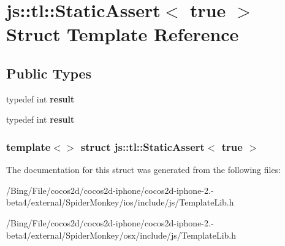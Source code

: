 \hypertarget{structjs_1_1tl_1_1_static_assert_3_01true_01_4}{\section{js\-:\-:tl\-:\-:Static\-Assert$<$ true $>$ Struct Template Reference}
\label{structjs_1_1tl_1_1_static_assert_3_01true_01_4}
}
\subsection*{Public Types}
\begin{DoxyCompactItemize}
\item 
\hypertarget{structjs_1_1tl_1_1_static_assert_3_01true_01_4_a8372a25aa4d92bc102e63660bcdaa6a9}{typedef int {\bfseries result}}\label{structjs_1_1tl_1_1_static_assert_3_01true_01_4_a8372a25aa4d92bc102e63660bcdaa6a9}

\item 
\hypertarget{structjs_1_1tl_1_1_static_assert_3_01true_01_4_a8372a25aa4d92bc102e63660bcdaa6a9}{typedef int {\bfseries result}}\label{structjs_1_1tl_1_1_static_assert_3_01true_01_4_a8372a25aa4d92bc102e63660bcdaa6a9}

\end{DoxyCompactItemize}
\subsubsection*{template$<$$>$ struct js\-::tl\-::\-Static\-Assert$<$ true $>$}



The documentation for this struct was generated from the following files\-:\begin{DoxyCompactItemize}
\item 
/\-Bing/\-File/cocos2d/cocos2d-\/iphone/cocos2d-\/iphone-\/2.-\/beta4/external/\-Spider\-Monkey/ios/include/js/Template\-Lib.\-h\item 
/\-Bing/\-File/cocos2d/cocos2d-\/iphone/cocos2d-\/iphone-\/2.-\/beta4/external/\-Spider\-Monkey/osx/include/js/Template\-Lib.\-h\end{DoxyCompactItemize}
